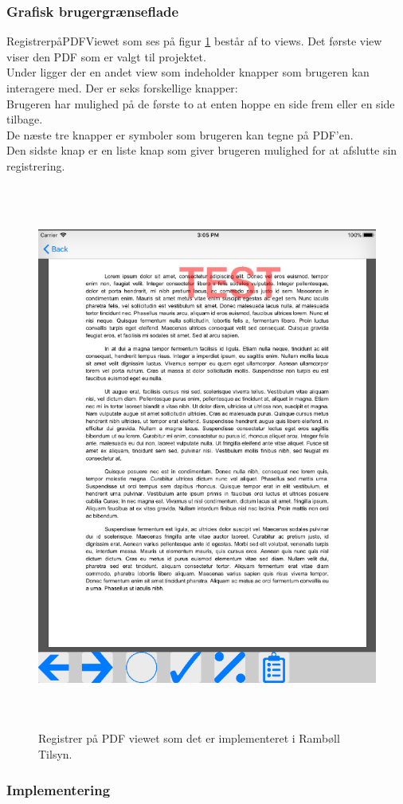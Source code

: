 \subsubsection{Grafisk brugergrænseflade}
RegistrerpåPDFViewet som ses på figur \ref{fig:RegistrerObjekterView} består af to views. Det første view viser den PDF som er valgt til projektet. \\
Under ligger der en andet view som indeholder knapper som brugeren kan interagere med. Der er seks forskellige knapper: \\
Brugeren har mulighed på de første to at enten hoppe en side frem eller en side tilbage. \\
De næste tre knapper er symboler som brugeren kan tegne på PDF'en. \\
Den sidste knap er en liste knap som giver brugeren mulighed for at afslutte sin registrering.
\begin{figure}[H] %
	\centering
	\includegraphics[height=18cm, width=15cm]{../ArkitekturDesign/Design/RegisterPDF/PDF}
	\caption{Registrer på PDF viewet som det er implementeret i Rambøll Tilsyn.}
	\label{fig:RegistrerObjekterView}
\end{figure}

\clearpage

\subsubsection{Implementering}